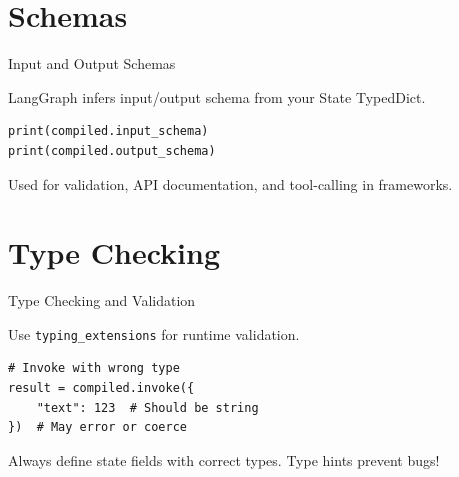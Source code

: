 \documentclass[aspectratio=169,11pt]{beamer}
\begin{document}
\section{Schemas}
\begin{frame}[fragile,t,shrink=3]{Input and Output Schemas}
\vspace{0.1cm}

\begin{tipbox}[Automatic]
LangGraph infers input/output schema from your State TypedDict.
\end{tipbox}

\vspace{0.1cm}

\begin{codebox}
\begin{lstlisting}
print(compiled.input_schema)
print(compiled.output_schema)
\end{lstlisting}
\end{codebox}

\vspace{0.15cm}

\begin{conceptbox}
Used for validation, API documentation, and tool-calling in frameworks.
\end{conceptbox}
\end{frame}

\section{Type Checking}
\begin{frame}[fragile,t]{Type Checking and Validation}
\vspace{0.1cm}

\begin{conceptbox}
Use \texttt{typing\_extensions} for runtime validation.
\end{conceptbox}

\vspace{0.1cm}

\begin{codebox}[Validation]
\begin{lstlisting}
# Invoke with wrong type
result = compiled.invoke({
    "text": 123  # Should be string
})  # May error or coerce
\end{lstlisting}
\end{codebox}

\vspace{0.15cm}

\begin{warningbox}[Tip]
Always define state fields with correct types. Type hints prevent bugs!
\end{warningbox}
\end{frame}
\end{document}

